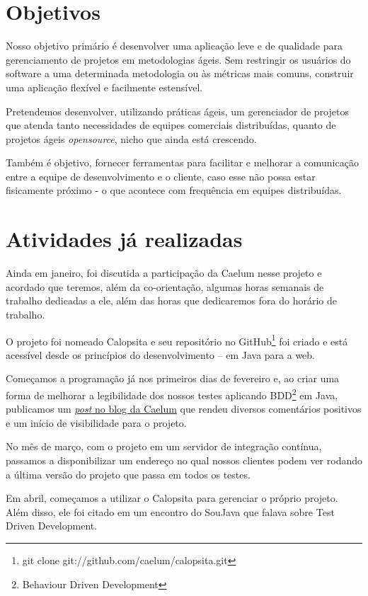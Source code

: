 \documentclass[titlepage]{article}
\begin{document}
\section{Objetivos}
Nosso objetivo primário é desenvolver uma aplicação leve e de qualidade para gerenciamento de projetos em metodologias ágeis. Sem restringir os usuários do software a uma determinada metodologia ou às métricas mais comuns, construir uma aplicação flexível e facilmente estensível.

Pretendemos desenvolver, utilizando práticas ágeis, um gerenciador de projetos que atenda tanto necessidades de equipes comerciais distribuídas, quanto de projetos ágeis \textit{opensource}, nicho que ainda está crescendo.

Também é objetivo, fornecer ferramentas para facilitar e melhorar a comunicação entre a equipe de desenvolvimento e o cliente, caso esse não possa estar fisicamente próximo - o que acontece com frequência em equipes distribuídas.

\section{Atividades já realizadas}
Ainda em janeiro, foi discutida a participação da Caelum nesse projeto e acordado que teremos, além da co-orientação, algumas horas semanais de trabalho dedicadas a ele, além das horas que dedicaremos fora do horário de trabalho.

O projeto foi nomeado Calopsita e seu repositório no GitHub\footnote{git clone git://github.com/caelum/calopsita.git} foi criado e está acessível desde os princípios do desenvolvimento -- em Java para a web.

Começamos a programação já nos primeiros dias de fevereiro e, ao criar uma forma de melhorar a legibilidade dos nossos testes aplicando BDD\footnote{Behaviour Driven Development} em Java, publicamos um \href{http://blog.caelum.com.br/2009/02/28/behavior-driven-development-com-junit/}{\textit{post} no blog da Caelum} que rendeu diversos comentários positivos e um início de visibilidade para o projeto.

No mês de março, com o projeto em um servidor de integração contínua, passamos a disponibilizar um endereço no qual nossos clientes podem ver rodando a última versão do projeto que passa em todos os testes.

Em abril, começamos a utilizar o Calopsita para gerenciar o próprio projeto. Além disso, ele foi citado em um encontro do SouJava que falava sobre Test Driven Development.
\end{document}
